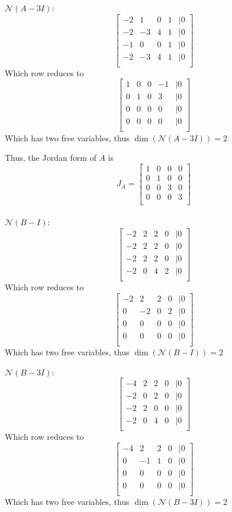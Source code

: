 \documentclass{article}
\begin{document}
\(\mathcal{N}(A-3I):\)
\[
\begin{bmatrix}
    -2 & 1 & 0 & 1 & | 0 \\
    -2 & -3 & 4 & 1 & | 0 \\
    -1 & 0 & 0 & 1 & | 0 \\
    -2 & -3 & 4 & 1 & | 0 \\
\end{bmatrix}
\]
Which row reduces to 
\[
\begin{bmatrix}
    1 & 0 & 0 & -1 & | 0 \\
    0 & 1 & 0 & 3 & | 0 \\
    0 & 0 & 0 & 0 & | 0 \\
    0 & 0 & 0 & 0 & | 0 \\
\end{bmatrix}
\]
Which has two free variables, thus \(\dim(\mathcal{N}(A-3I)) = 2\)

Thus, the Jordan form of \(A\) is
\[
J_A = \begin{bmatrix}
    1 & 0 & 0 & 0 \\
    0 & 1 & 0 & 0 \\
    0 & 0 & 3 & 0 \\
    0 & 0 & 0 & 3 \\
\end{bmatrix}
\]
\\

\(\mathcal{N}(B-I):\)
\[
\begin{bmatrix}
    -2 & 2 & 2 & 0 & | 0 \\
    -2 & 2 & 2 & 0 & | 0 \\
    -2 & 2 & 2 & 0 & | 0 \\
    -2 & 0 & 4 & 2 & | 0 \\
\end{bmatrix}
\]
Which row reduces to 
\[
\begin{bmatrix}
    -2 & 2 & 2 & 0 & | 0 \\
    0 & -2 & 0 & 2 & | 0 \\
    0 & 0 & 0 & 0 & | 0 \\
    0 & 0 & 0 & 0 & | 0 \\
\end{bmatrix}
\]
Which has two free variables, thus \(\dim(\mathcal{N}(B-I)) = 2\)

\(\mathcal{N}(B-3I):\)
\[
\begin{bmatrix}
    -4 & 2 & 2 & 0 & | 0 \\
    -2 & 0 & 2 & 0 & | 0 \\
    -2 & 2 & 0 & 0 & | 0 \\
    -2 & 0 & 4 & 0 & | 0 \\
\end{bmatrix}
\]
Which row reduces to 
\[
\begin{bmatrix}
    -4 & 2 & 2 & 0 & | 0 \\
    0 & -1 & 1 & 0 & | 0 \\
    0 & 0 & 0 & 0 & | 0 \\
    0 & 0 & 0 & 0 & | 0 \\
\end{bmatrix}
\]
Which has two free variables, thus \(\dim(\mathcal{N}(B-3I)) = 2\)
\end{document}
